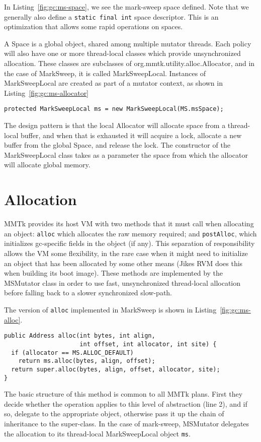 In Listing~\ref{fig:gc:ms-space}, we see the mark-sweep space defined.  Note
that we generally also define a \lstinline|static final int| space descriptor.  This is
an optimization that allows some rapid operations on spaces.

A Space is a global object, shared among multiple mutator threads.  
Each policy will also have one or more thread-local classes which provide unsynchronized allocation.  
These classes are subclasses of org.mmtk.utility.alloc.Allocator, and in the case of MarkSweep, 
it is called MarkSweepLocal.  Instances of MarkSweepLocal are created as 
part of a mutator context, as shown in Listing~\ref{fig:gc:ms-allocator}

\begin{lstlisting}[name=MSMutator.java,caption=\lstname: definition of the ms
allocator,label=fig:gc:ms-allocator]
protected MarkSweepLocal ms = new MarkSweepLocal(MS.msSpace);
\end{lstlisting}
The design pattern is that the local Allocator will allocate space 
from a thread-local buffer, and when that is exhausted it will 
acquire a lock, allocate a new buffer from the global Space, and release the lock.  
The constructor of the MarkSweepLocal class takes as a parameter the space from
which the allocator will allocate global memory.

\section{Allocation}

MMTk provides its host VM with 
two methods that it must call when allocating an object: \lstinline|alloc| which
allocates the raw memory required; and \lstinline|postAlloc|, which initializes
gc-specific fields in the object (if any).  This separation of responsibility
allows the VM some flexibility, in the rare case when it might need to
initialize an object that has been allocated by some other means (Jikes RVM
does this when building its boot image). 
These methods are implemented by the MSMutator
class in order to use fast, unsynchronized thread-local allocation before falling 
back to a slower synchronized slow-path.

The version of \lstinline|alloc| implemented in MarkSweep is shown in
Listing~\ref{fig:gc:ms-alloc}.
\begin{lstlisting}[name=MSMutator.java,
caption=\lstname: The alloc method in the mark-sweep plan.,label=fig:gc:ms-alloc] 
public Address alloc(int bytes, int align, 
                     int offset, int allocator, int site) {
  if (allocator == MS.ALLOC_DEFAULT) 
    return ms.alloc(bytes, align, offset);
  return super.alloc(bytes, align, offset, allocator, site);
}
\end{lstlisting}
The basic structure of this method is common to all MMTk plans.  
First they decide whether the operation applies to this level of abstraction 
(line 2), and if so, delegate to the
appropriate object, otherwise pass it up the chain of inheritance to the
super-class.
In the case of mark-sweep, MSMutator delegates the allocation to its
thread-local MarkSweepLocal object \lstinline|ms|.

